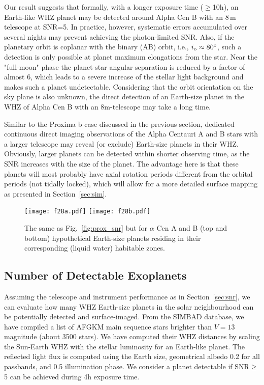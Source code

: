 \documentclass{emulateapj}
\begin{document}
Our result suggests that formally, with a longer exposure time ($\ge$10h), 
an Earth-like WHZ planet may be detected around Alpha Cen B with an 8\,m telescope 
at SNR=5. In practice, however, systematic errors accumulated over several nights may prevent 
achieving the photon-limited SNR. Also, if the planetary orbit is coplanar with the binary (AB) orbit,
i.e., $i_{\rm o}\approx80^\circ$, such a detection is only possible at planet maximum elongations
from the star. Near the "full-moon" phase the planet-star angular separation is reduced by a factor 
of almost 6, which leads to a severe increase of the stellar light background and makes such
a planet undetectable. Considering that the orbit orientation on the sky plane is also
unknown, the direct detection of an Earth-size planet in the WHZ of Alpha Cen B with an
8m-telescope may take a long time.

Similar to the Proxima b case discussed in the previous section, 
dedicated continuous direct imaging observations of the Alpha Centauri A and B stars
with a larger telescope
may reveal (or exclude) Earth-size planets in their WHZ. 
Obviously, larger planets can be detected within shorter observing time,
as the SNR increases with the size of the planet.
The advantage here is that these planets will most probably have axial rotation periods 
different from the orbital periods (not tidally locked), 
which will allow for a more detailed surface mapping as presented in Section~\ref{sec:sim}.

\begin{figure}
\centering
   \texttt{[image: f28a.pdf]}
   \texttt{[image: f28b.pdf]}
\caption{The same as Fig.~\ref{fig:prox_snr} but for $\alpha$ Cen A and B
(top and bottom) hypothetical Earth-size planets residing 
in their corresponding (liquid water) habitable zones.
}
\label{fig:acen_ab_snr}
\end{figure}


\subsection{Number of Detectable Exoplanets}\label{sec:npl}

Assuming the telescope and instrument performance as in Section~\ref{sec:snr}, 
we can evaluate how many
WHZ Earth-size planets in the solar neighbourhood can be potentially detected
and surface-imaged. From the SIMBAD database, we have compiled a list of AFGKM
main sequence stars brighter than $V=13$ magnitude (about 3500 stars). 
We have computed their WHZ distances by scaling the 
Sun-Earth WHZ with the stellar luminosity for an Earth-like planet.
The reflected light flux is computed using the Earth size, 
geometrical albedo 0.2 for all passbands, and 0.5 illumination phase.
We consider a planet detectable if SNR$\ge$5 can be achieved during 4h exposure time.
\end{document}
